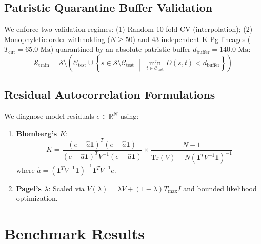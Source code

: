 \documentclass[sigconf,nonacm]{acmart}
\begin{document}
\subsection{Patristic Quarantine Buffer Validation}
We enforce two validation regimes: (1) Random 10-fold CV (interpolation); (2) Monophyletic order withholding ($N \ge 50$) and 43 independent K-Pg lineages ($T_{\text{cut}} = 65.0\text{ Ma}$) quarantined by an absolute patristic buffer $d_{\text{buffer}} = 140.0\text{ Ma}$:
\begin{equation}
\mathcal{S}_{\text{train}} = \mathcal{S} \setminus \left( \mathcal{C}_{\text{test}} \cup \left\{ s \in \mathcal{S} \setminus \mathcal{C}_{\text{test}} \;\middle|\; \min_{t \in \mathcal{C}_{\text{test}}} D(s, t) < d_{\text{buffer}} \right\} \right)
\end{equation}

\subsection{Residual Autocorrelation Formulations}
We diagnose model residuals $e \in \mathbb{R}^N$ using:
\begin{enumerate}
    \item \textbf{Blomberg's $K$}:
    \begin{equation}
    K = \frac{(e - \hat{a}\mathbf{1})^T (e - \hat{a}\mathbf{1})}{(e - \hat{a}\mathbf{1})^T V^{-1} (e - \hat{a}\mathbf{1})} \times \frac{N - 1}{\text{Tr}(V) - N (\mathbf{1}^T V^{-1} \mathbf{1})^{-1}}
    \end{equation}
    where $\hat{a} = (\mathbf{1}^T V^{-1} \mathbf{1})^{-1} \mathbf{1}^T V^{-1} e$.
    \item \textbf{Pagel's $\lambda$}: Scaled via $V(\lambda) = \lambda V + (1 - \lambda) T_{\text{max}} I$ and bounded likelihood optimization.
\end{enumerate}

\section{Benchmark Results}
\end{document}
